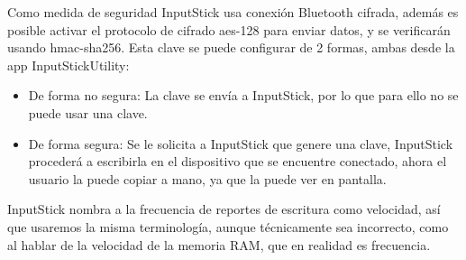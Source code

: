 Como medida de seguridad InputStick usa conexión Bluetooth cifrada\cite{stickfaq}, además es posible activar el protocolo de cifrado \gls{aes}-128 para enviar datos, y se verificarán usando \gls{hmac}-\gls{sha}256\cite{sticksecurity}. Esta clave se puede configurar de 2 formas, ambas desde la app InputStickUtility:
\begin{itemize}
    \item De forma no segura: La clave se envía a InputStick, por lo que para ello no se puede usar una clave.
    \item De forma segura: Se le solicita a InputStick que genere una clave, InputStick procederá a escribirla en el dispositivo que se encuentre conectado, ahora el usuario la puede copiar a mano, ya que la puede ver en pantalla.
\end{itemize}

InputStick nombra a la frecuencia de reportes de escritura como velocidad, así que usaremos la misma terminología, aunque técnicamente sea incorrecto, como al hablar de la velocidad de la memoria RAM, que en realidad es frecuencia.